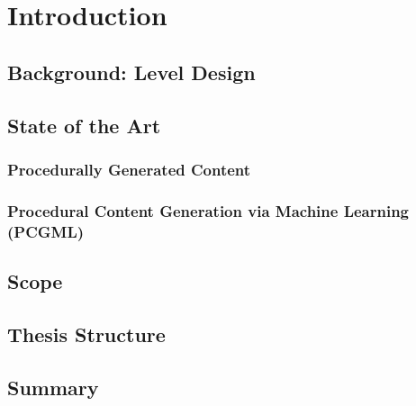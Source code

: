 \chapter{Introduction}
\section{Background: Level Design}
\section{State of the Art}
\subsection{Procedurally Generated Content}
\subsection{Procedural Content Generation via Machine Learning (PCGML)}
\section{Scope}
\section{Thesis Structure}
\section{Summary}